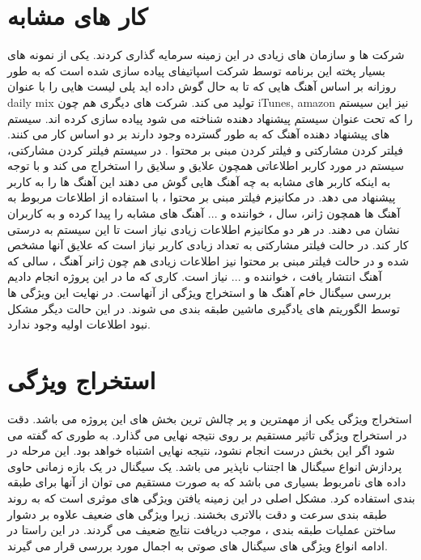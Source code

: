 \documentclass[conference]{IEEEtran}
\begin{document}
    \section{کار های مشابه}
    شرکت ها و سازمان های زیادی در این زمینه سرمایه گذاری کردند. یکی از نمونه های بسیار پخته این برنامه توسط شرکت اسپاتیفای پیاده سازی شده است که به طور روزانه بر اساس آهنگ هایی که تا به حال گوش داده اید پلی لیست هایی را با عنوان daily mix تولید می کند.  شرکت های دیگری هم چون iTunes, amazon  نیز این سیستم را که تحت عنوان سیستم پیشنهاد دهنده  شناخته می شود پیاده سازی کرده اند.
سیستم های پیشنهاد دهنده آهنگ که به طور گسترده وجود دارند بر دو اساس کار می کنند. فیلتر کردن مشارکتی   و فیلتر کردن مبنی بر محتوا . در سیستم فیلتر کردن مشارکتی، سیستم در مورد کاربر اطلاعاتی همچون علایق و سلایق را استخراج می کند و با توجه به اینکه کاربر های مشابه به چه آهنگ هایی گوش می دهند این آهنگ ها را به کاربر پیشنهاد می دهد. در مکانیزم فیلتر مبنی بر محتوا ، با استفاده از اطلاعات مربوط به آهنگ ها همچون ژانر، سال ، خواننده و ... آهنگ های مشابه را پیدا کرده و به کاربران نشان می دهند. در هر دو مکانیزم اطلاعات زیادی نیاز است تا این سیستم به درستی کار کند. در حالت فیلتر مشارکتی به تعداد زیادی کاربر نیاز است که علایق آنها مشخص شده و در حالت فیلتر مبنی بر محتوا نیز اطلاعات زیادی هم چون ژانر آهنگ ، سالی که آهنگ انتشار یافت ، خواننده و ... نیاز است. کاری که ما در این پروژه انجام دادیم بررسی سیگنال خام آهنگ ها و استخراج ویژگی از آنهاست. در نهایت این ویژگی ها توسط الگوریتم های یادگیری ماشین طبقه بندی می شوند. در این حالت دیگر مشکل نبود اطلاعات اولیه وجود ندارد.
    \section{ استخراج ویژگی  }
استخراج ویژگی یکی از مهمترین و پر چالش ترین بخش های این پروژه می باشد. دقت در استخراج ویژگی تاثیر مستقیم بر روی نتیجه نهایی می گذارد. به طوری که گفته می شود اگر این بخش درست انجام نشود، نتیجه نهایی اشتباه خواهد بود. 
این مرحله در پردازش انواع سیگنال ها اجتناب ناپذیر می باشد. یک سیگنال در یک بازه زمانی حاوی داده های نامربوط بسیاری می باشد که به صورت مستقیم می توان از آنها برای طبقه بندی استفاده کرد. مشکل اصلی در این زمینه یافتن ویژگی های موثری است که به روند طبقه بندی سرعت و دقت بالاتری بخشند. زیرا ویژگی های ضعیف علاوه بر دشوار ساختن عملیات طبقه بندی ، موجب دریافت نتایج ضعیف می گردند. در این راستا در ادامه انواع ویژگی های سیگنال های صوتی به اجمال مورد بررسی قرار می گیرند. 
\end{document}
